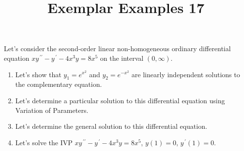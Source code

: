 \documentclass{ximera}
\begin{document}
\begin{abstract}
 \end{abstract}

    \title{Exemplar Examples 17}
    
    \maketitle


Let's consider the second-order linear non-homogeneous ordinary differential equation $xy^{\,\prime\prime}-y^{\,\prime}-4x^3y=8x^5$ on the interval $(0,\infty)$.

\begin{enumerate}

\item Let's show that $y_1=e^{x^2}$ and $y_2=e^{-x^2}$ are linearly independent solutions to the complementary equation.

\vfill

\item Let's determine a particular solution to this differential equation using Variation of Parameters.



\vfill
\vfill
\vfill

\newpage

\item Let's determine the general solution to this differential equation.



\vfill

\item Let's solve the IVP $xy^{\,\prime\prime}-y^{\,\prime}-4x^3y=8x^5$, $y(1)=0$, $y^{\,\prime}(1)=0$.



\vfill
\vfill
\vfill


\end{enumerate}
\end{document}
